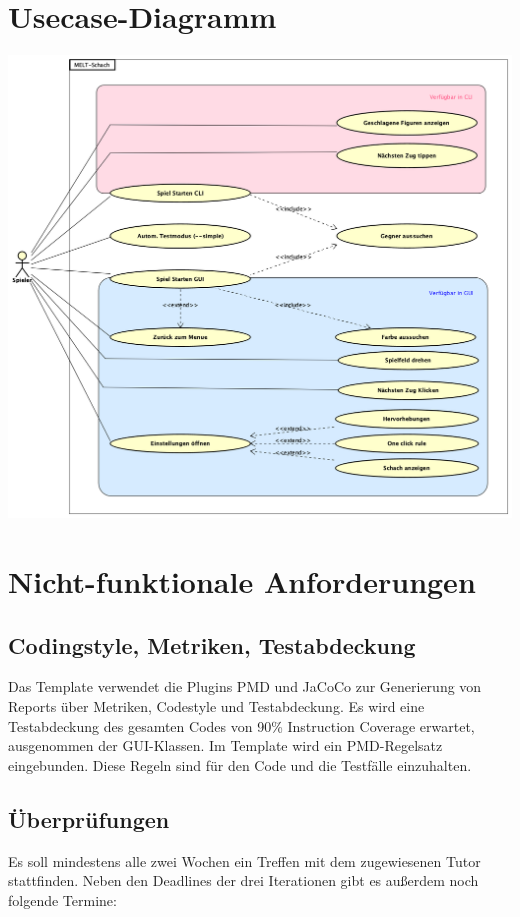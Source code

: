 \documentclass{scrreprt}
\begin{document}
\section{Usecase-Diagramm}
\includegraphics[width=\linewidth,keepaspectratio]{resources/UseCaseMELT1_0.png}

\section{Nicht-funktionale Anforderungen}

\subsection{Codingstyle, Metriken, Testabdeckung}
Das Template verwendet die Plugins PMD und JaCoCo zur Generierung von Reports über Metriken, Codestyle und Testabdeckung.
Es wird eine Testabdeckung des gesamten Codes von 90\% Instruction Coverage erwartet, ausgenommen der GUI-Klassen.
Im Template wird ein PMD-Regelsatz eingebunden. Diese Regeln sind für den Code und die Testfälle einzuhalten.


\subsection{Überprüfungen}
Es soll mindestens alle zwei Wochen ein Treffen mit dem zugewiesenen Tutor stattfinden. Neben den Deadlines der drei Iterationen gibt es außerdem noch folgende Termine:
\end{document}

